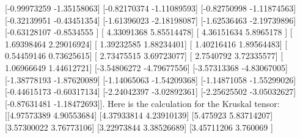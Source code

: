 \documentclass{article}%
\begin{document}
 {[}{-}0.99973259 {-}1.35158063{]}\newline%
 {[}{-}0.82170374 {-}1.11089593{]}\newline%
 {[}{-}0.82750998 {-}1.11874563{]}\newline%
 {[}{-}0.32139951 {-}0.43451354{]}\newline%
 {[}{-}1.61396023 {-}2.18198087{]}\newline%
 {[}{-}1.62536463 {-}2.19739896{]}\newline%
 {[}{-}0.63128107 {-}0.8534555 {]}\newline%
 {[} 4.33091368  5.85514478{]}\newline%
 {[} 4.36151634  5.8965178 {]}\newline%
 {[} 1.69398464  2.29016924{]}\newline%
 {[} 1.39232585  1.88234401{]}\newline%
 {[} 1.40216416  1.89564483{]}\newline%
 {[} 0.54459146  0.73625615{]}\newline%
 {[} 2.73475515  3.69723077{]}\newline%
 {[} 2.7540792   3.72335577{]}\newline%
 {[} 1.06966649  1.44612721{]}\newline%
 {[}{-}3.54806272 {-}4.79677556{]}\newline%
 {[}{-}3.57313368 {-}4.83067005{]}\newline%
 {[}{-}1.38778193 {-}1.87620089{]}\newline%
 {[}{-}1.14065063 {-}1.54209368{]}\newline%
 {[}{-}1.14871058 {-}1.55299026{]}\newline%
 {[}{-}0.44615173 {-}0.60317134{]}\newline%
 {[}{-}2.24042397 {-}3.02892361{]}\newline%
 {[}{-}2.25625502 {-}3.05032627{]}\newline%
 {[}{-}0.87631481 {-}1.18472693{]}{]}.\newline%
\newline%
%
Here is the calculation for the Kruskal tensor: {[}{[}4.97573389 4.90553684{]}\newline%
 {[}4.37933814 4.23910139{]}\newline%
 {[}5.475923   5.83714207{]}\newline%
 {[}3.57300022 3.76773106{]}\newline%
 {[}3.22973844 3.38526689{]}\newline%
 {[}3.45711206 3.760069  {]}\newline%
\end{document}

